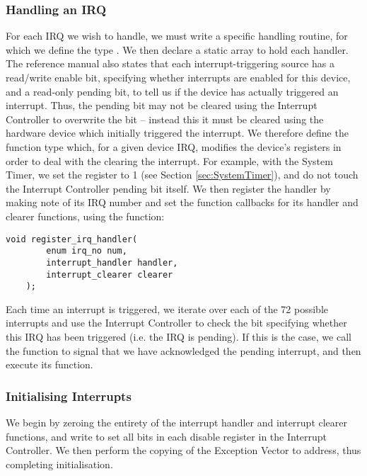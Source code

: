     \subsubsection{Handling an IRQ}
        \label{sec:IRQ_clearing}
        For each IRQ we wish to handle, we must write a specific handling
        routine, for which we define the type . We then
        declare a static array to hold each handler. The reference manual also
        states \cite[pg.~109]{BCM2835} that each interrupt-triggering source has
        a read/write enable bit, specifying whether interrupts are enabled for
        this device, and a read-only pending bit, to tell us if the device has
        actually triggered an interrupt. Thus, the pending bit may not be
        cleared using the Interrupt Controller to overwrite the bit -- instead
        this it must be cleared using the hardware device which initially
        triggered the interrupt. We therefore define the function type
         which, for a given device IRQ, modifies the
        device's registers in order to deal with the clearing the interrupt. For
        example, with the System Timer, we set the  register to 1
        (see Section \ref{sec:SystemTimer}), and do not touch the Interrupt
        Controller pending bit itself. We then register the handler by making
        note of its IRQ number and set the function callbacks for its handler
        and clearer functions, using the function:
        \lstset{language=c}
        \begin{lstlisting}[caption={Registering an IRQ}, captionpos=b]
void register_irq_handler(
        enum irq_no num,
        interrupt_handler handler,
        interrupt_clearer clearer
    );
        \end{lstlisting}

        Each time an interrupt is triggered, we iterate over each of the 72
        possible interrupts and use the Interrupt Controller to check the
        bit specifying whether this IRQ has been triggered (i.e. the IRQ is
        pending). If this is the case, we call the  function to
        signal that we have acknowledged the pending interrupt, and then execute
        its  function.

    \subsubsection{Initialising Interrupts}
        We begin by zeroing the entirety of the interrupt handler and interrupt
        clearer functions, and write  to set all bits in each
        disable register in the Interrupt Controller. We then perform the
        copying of the Exception Vector to address, thus completing
        initialisation.


